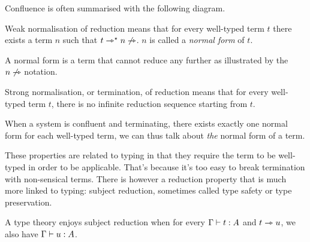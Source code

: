 Confluence is often summarised with the following diagram.

\begin{center}
\end{center}

\begin{definition}
  Weak normalisation of reduction means that for every well-typed term \(t\)
  there exists a term \(n\) such that \(t \rightarrowtriangle^{\star} n \not\rightarrowtriangle\).
  \(n\) is called a \emph{normal form} of \(t\).
\end{definition}

A normal form is a term that cannot reduce any further as illustrated by the
\(n \not\rightarrowtriangle\) notation.

\begin{definition}
  Strong normalisation, or termination, of reduction means that for every
  well-typed term \(t\), there is no infinite reduction sequence starting from
  \(t\).
\end{definition}

When a system is confluent and terminating, there exists exactly one normal form
for each well-typed term, we can thus talk about \emph{the} normal form of a
term.

These properties are related to typing in that they require the term to be
well-typed in order to be applicable. That's because it's too easy to break
termination with non-sensical terms.
There is however a reduction property that is much more linked to typing:
subject reduction, sometimes called type safety or type preservation.

\begin{definition}
  A type theory enjoys subject reduction when for every \(\Gamma \vdash t : A\)
  and \(t \rightarrowtriangle u\), we also have \(\Gamma \vdash u : A\).
\end{definition}

